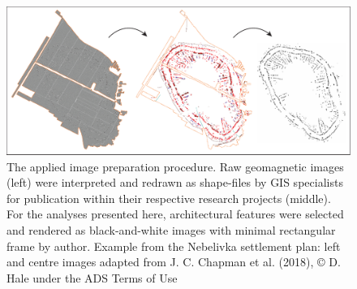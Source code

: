 \documentclass[
  12pt,
  a4paper, twoside]{book}
\begin{document}
\begin{figure}

{\centering \includegraphics[width=0.9\linewidth]{Data/fig08_image_prep} 

}

\caption[Illustration of the plan image preparation procedure]{The applied image preparation procedure. Raw geomagnetic images (left) were interpreted and redrawn as shape-files by GIS specialists for publication within their respective research projects (middle). For the analyses presented here, architectural features were selected and rendered as black-and-white images with minimal rectangular frame by author. Example from the Nebelivka settlement plan: left and centre images adapted from J. C. Chapman et al. (2018), © D. Hale under the ADS Terms of Use}\label{fig:08-image-prep}
\end{figure}
\end{document}
